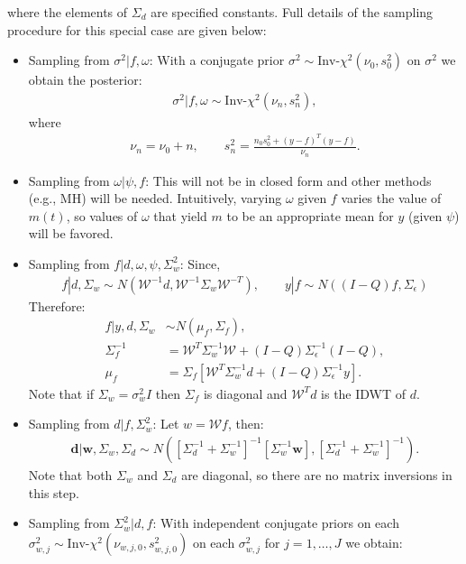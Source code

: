 \documentclass[a4paper,11pt]{article}
\begin{document}
where the elements of $\Sigma_{d}$ are specified constants. Full details of the sampling procedure for this special case are given below:
\begin{itemize}
\item Sampling from $\sigma^{2}|f,\omega$: With a conjugate prior $\sigma^{2}\sim\textrm{Inv-}\chi^{2}(\nu_{0},s_{0}^{2})$ on $\sigma^{2}$ we obtain the posterior:
\begin{align*}
 \sigma^{2} | f,\omega \sim \textrm{Inv-}\chi^{2}(\nu_{n},s_{n}^{2}) ,
\end{align*} 
where 
\begin{align*}
 \nu_{n} = \nu_{0} + n , \qquad s_{n}^{2} = \frac{n_{0}s_{0}^{2}+(y-f)^{T}(y-f)}{\nu_{n}} .
\end{align*}
\item Sampling from $\omega|\psi,f$: This will not be in closed form and other methods (e.g., MH) will be needed. Intuitively, varying $\omega$ given $f$ varies the value of $m(t)$, so values of $\omega$ that yield $m$ to be an appropriate mean for $y$ (given $\psi$) will be favored.
\item Sampling from $f|d,\omega,\psi,\Sigma^{2}_{w}$: Since,
\begin{align*}
f|d,\Sigma_{w} \sim N\left(\mathcal{W}^{-1}d,\mathcal{W}^{-1}\Sigma_{w}\mathcal{W}^{-T}\right) , \qquad 
y|f \sim N\left((I-Q)f,\Sigma_{\epsilon}\right) 
\end{align*}
Therefore:
\begin{align*}
 f | y,d,\Sigma_{w} &\sim N\left(\mu_{f},\Sigma_{f}\right) , \\
 \Sigma_{f}^{-1} &= \mathcal{W}^{T}\Sigma_{w}^{-1}\mathcal{W} + (I-Q)\Sigma_{\epsilon}^{-1}(I-Q) ,\\
 \mu_{f} &= \Sigma_{f}\left[ \mathcal{W}^{T}\Sigma_{w}^{-1}d + (I-Q)\Sigma_{\epsilon}^{-1}y\right] .
\end{align*}
Note that if $\Sigma_{w}=\sigma^{2}_{w}I$ then $\Sigma_{f}$ is diagonal and $\mathcal{W}^{T}d$ is the IDWT of $d$.
\item Sampling from $d|f,\Sigma^{2}_{w}$: Let $w=\mathcal{W}f$, then:
\begin{align*}
 \mathbf{d} | \mathbf{w}, \Sigma_{w}, \Sigma_{d} \sim
   N\left(\left[\Sigma_{d}^{-1}+\Sigma_{w}^{-1}\right]^{-1}\left[\Sigma_{w}^{-1}\mathbf{w}\right],\left[\Sigma_{d}^{-1}+\Sigma_{w}^{-1}\right]^{-1}\right) .
 \end{align*}
 Note that both $\Sigma_{w}$ and $\Sigma_{d}$ are diagonal, so there are no matrix inversions in this step.
\item Sampling from $\Sigma^{2}_{w}|d,f$: With independent conjugate priors on each $\sigma^{2}_{w,j}\sim\textrm{Inv-}\chi^{2}(\nu_{w,j,0},s_{w,j,0}^{2})$ on each $\sigma^{2}_{w,j}$ for $j=1,\ldots,J$ we obtain:

\end{itemize}
\end{document}
